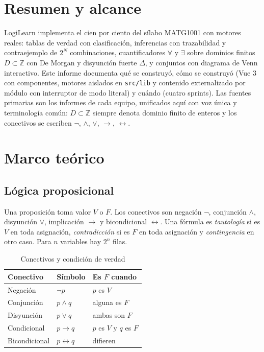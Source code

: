 \documentclass[11pt,a4paper,openany]{book}
\begin{document}
\chapter{Resumen y alcance}
\label{ch:resumen}
LogiLearn implementa el cien por ciento del s\'ilabo MATG1001 con motores reales: tablas de verdad con clasificaci\'on, inferencias con trazabilidad y contraejemplo de $2^{N}$ combinaciones, cuantificadores $\forall$ y $\exists$ sobre dominios finitos $D \subset \mathbb{Z}$ con De Morgan y disyunci\'on fuerte $\Delta$, y conjuntos con diagrama de Venn interactivo. Este informe documenta qu\'e se construy\'o, c\'omo se construy\'o (Vue 3 con componentes, motores aislados en \texttt{src/lib} y contenido externalizado por m\'odulo con interruptor de modo literal) y cu\'ando (cuatro sprints). Las fuentes primarias son los informes de cada equipo, unificados aqu\'i con voz \'unica y terminolog\'ia com\'un: $D \subset \mathbb{Z}$ siempre denota dominio finito de enteros y los conectivos se escriben $\lnot$, $\land$, $\lor$, $\to$, $\leftrightarrow$.

\chapter{Marco te\'orico}
\label{ch:marco}
\section{L\'ogica proposicional}
Una proposici\'on toma valor $V$ o $F$. Los conectivos son negaci\'on $\lnot$, conjunci\'on $\land$, disyunci\'on $\lor$, implicaci\'on $\to$ y bicondicional $\leftrightarrow$. Una f\'ormula es \textit{tautolog\'ia} si es $V$ en toda asignaci\'on, \textit{contradicci\'on} si es $F$ en toda asignaci\'on y \textit{contingencia} en otro caso. Para $n$ variables hay $2^{n}$ filas.
\begin{table}[H]
\centering
\caption{Conectivos y condici\'on de verdad}
\begin{tabular}{lll}
\toprule
Conectivo & S\'imbolo & Es $F$ cuando \\
\midrule
Negaci\'on & $\lnot p$ & $p$ es $V$ \\
Conjunci\'on & $p \land q$ & alguna es $F$ \\
Disyunci\'on & $p \lor q$ & ambas son $F$ \\
Condicional & $p \to q$ & $p$ es $V$ y $q$ es $F$ \\
Bicondicional & $p \leftrightarrow q$ & difieren \\
\bottomrule
\end{tabular}
\end{table}
\end{document}
